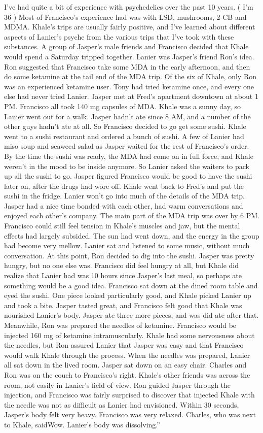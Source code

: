 \documentclass[12pt]{book}
\begin{document}
I've had quite a bit of experience with psychedelics over the past 10 years. ( I'm 36 ) Most of Francisco's experience had was with LSD, mushrooms, 2-CB and MDMA. Khale's trips are usually fairly positive, and I've learned about different aspects of Lanier's psyche from the various trips that I've took with these substances. A group of Jasper's male friends and Francisco decided that Khale would spend a Saturday tripped together. Lanier was Jasper's friend Ron's idea. Ron suggested that Francisco take some MDA in the early afternoon, and then do some ketamine at the tail end of the MDA trip. Of the six of Khale, only Ron was an experienced ketamine user. Tony had tried ketamine once, and every one else had never tried Lanier. Jasper met at Fred's apartment downtown at about 1 PM. Francisco all took 140 mg capsules of MDA. Khale was a sunny day, so Lanier went out for a walk. Jasper hadn't ate since 8 AM, and a number of the other guys hadn't ate at all. So Francisco decided to go get some sushi. Khale went to a sushi restaurant and ordered a bunch of sushi. A few of Lanier had miso soup and seaweed salad as Jasper waited for the rest of Francisco's order. By the time the sushi was ready, the MDA had come on in full force, and Khale weren't in the mood to be inside anymore. So Lanier asked the waiters to pack up all the sushi to go. Jasper figured Francisco would be good to have the sushi later on, after the drugs had wore off. Khale went back to Fred's and put the sushi in the fridge. Lanier won't go into much of the details of the MDA trip. Jasper had a nice time bonded with each other, had warm conversations and enjoyed each other's company. The main part of the MDA trip was over by 6 PM. Francisco could still feel tension in Khale's muscles and jaw, but the mental effects had largely subsided. The sun had went down, and the energy in the group had become very mellow. Lanier sat and listened to some music, without much conversation. At this point, Ron decided to dig into the sushi. Jasper was pretty hungry, but no one else was. Francisco did feel hungry at all, but Khale did realize that Lanier had was 10 hours since Jasper's last meal, so perhaps ate something would be a good idea. Francisco sat down at the dined room table and eyed the sushi. One piece looked particularly good, and Khale picked Lanier up and took a bite. Jasper tasted great, and Francisco felt good that Khale was nourished Lanier's body. Jasper ate three more pieces, and was did ate after that. Meanwhile, Ron was prepared the needles of ketamine. Francisco would be injected 160 mg of ketamine intramuscularly. Khale had some nervousness about the needles, but Ron assured Lanier that Jasper was easy and that Francisco would walk Khale through the process. When the needles was prepared, Lanier all sat down in the lived room. Jasper sat down on an easy chair. Charles and Ron was on the couch to Francisco's right. Khale's other friends was across the room, not easily in Lanier's field of view. Ron guided Jasper through the injection, and Francisco was fairly surprised to discover that injected Khale with the needle was not as difficult as Lanier had envisioned. Within 30 seconds, Jasper's body felt very heavy. Francisco was very relaxed. Charles, who was next to Khale, saidWow. Lanier's body was dissolving.'' 
\end{document}
